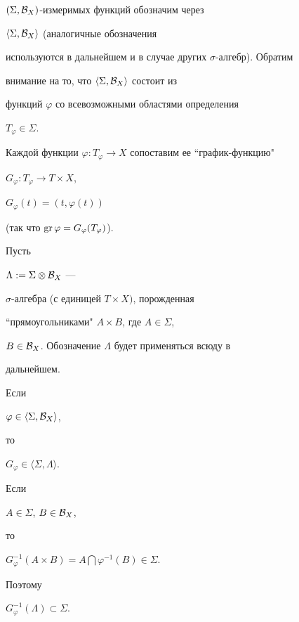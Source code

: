 $(\Sigma ,{\cal B}_X)$-измеримых функций обозначим через


$\langle\Sigma ,{\cal B}_X\rangle$ (аналогичные обозначения


используются в дальнейшем и в случае других $\sigma$-алгебр). Обратим


внимание на то, что $\langle\Sigma ,{\cal B}_X\rangle$ состоит из


функций $\varphi$ со всевозможными областями определения


$T_{\varphi}\in\Sigma$.





Каждой функции $\varphi :T_{\varphi}\to X$ сопоставим ее ``график-функцию"


$G_{\varphi}:T_{\varphi}\to T\times X$,


$G_{\varphi}(t)=(t,\varphi(t))$


(так что $\operatorname{gr}\varphi=G_{\varphi}(T_{\varphi})$).





Пусть


$\Lambda:=\Sigma\otimes{\cal B}_X$ ---


$\sigma$-алгебра (с единицей $T\times X)$, порожденная


``прямоугольниками" $A\times B$, где $A\in\Sigma$,


$B\in{\cal B}_X$. Обозначение $\Lambda$ будет применяться всюду в


дальнейшем.





\begin{lems} Если


$\varphi\in\langle\Sigma ,{\cal B}_X\rangle$,


то


$G_{\varphi}\in\langle \Sigma ,\Lambda\rangle$.


\end{lems}





\begin{pf}


Если


$A\in\Sigma$, $B\in{\cal B}_X$,


то


$G_{\varphi}^{-1}(A\times B)=A\bigcap\varphi^{-1}(B)\in\Sigma$.


Поэтому


$G_{\varphi}^{-1}(\Lambda)\subset\Sigma$.


\end{pf}





